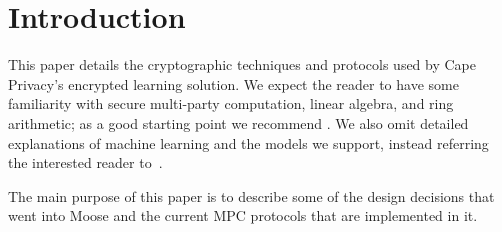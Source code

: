 
\section{Introduction}

This paper details the cryptographic techniques and protocols used by Cape
Privacy's encrypted learning solution. We expect the reader to have some
familiarity with secure multi-party computation, linear algebra, and ring
arithmetic; as a good starting point we recommend \cite{evans2017pragmatic}. We
also omit detailed explanations of machine learning and the models we support,
instead referring the interested reader to~\cite{mml}.

The main purpose of this paper is to describe some of the design decisions that went into Moose
and the current MPC protocols that are implemented in it.


% 
